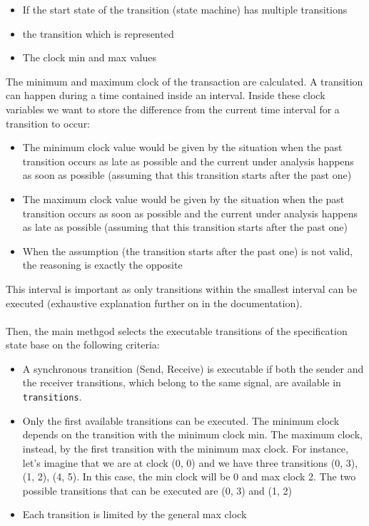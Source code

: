 \documentclass[12pt]{article}
\begin{document}
\begin{itemize}
\item If the start state of the transition (state machine) has multiple transitions
\item the transition which is represented
\item The clock min and max values
\end{itemize}
The minimum and maximum clock of the transaction are calculated. A transition can happen during a time contained inside an interval. Inside these clock variables we want to store the difference from the current time interval for a transition to occur:
\begin{itemize}
\item The minimum clock value would be given by the situation when the past transition occurs as late as possible and the current under analysis happens as soon as possible (assuming that this transition starts after the past one)
\item The maximum clock value would be given by the situation when the past transition occurs as soon as possible and the current under analysis happens as late as possible (assuming that this transition starts after the past one)
\item When the assumption (the transition starts after the past one) is not valid, the reasoning is exactly the opposite
\end{itemize}
This interval is important as only transitions within the smallest interval can be executed (exhaustive explanation further on in the documentation).
\\\\
Then, the main methgod selects the executable transitions of the specification state base on the following criteria:
\begin{itemize}
\item A synchronous transition (Send, Receive) is executable if both the sender and the receiver transitions, which belong to the same signal, are available in \texttt{transitions}.
\item Only the first available transitions can be executed. The minimum clock depends on the transition with the minimum clock min. The maximum clock, instead, by the first transition with the minimum max clock. For instance, let's imagine that we are at clock (0, 0) and we have three transitions (0, 3), (1, 2), (4, 5). In this case, the min clock will be 0 and max clock 2. The two possible transitions that can be executed are (0, 3) and (1, 2)
\item Each transition is limited by the general max clock
\end{itemize}
\end{document}
